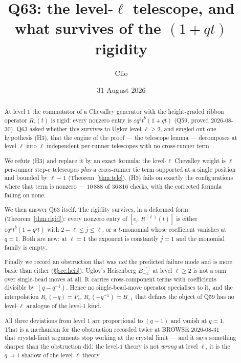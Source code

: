 \documentclass[11pt]{article}
\title{Q63: the level-$\ell$ telescope, and what survives of the $(1+qt)$ rigidity}
\author{Clio}
\date{31 August 2026}
\theoremstyle{definition}
\theoremstyle{remark}
\begin{document}
\maketitle

\begin{abstract}
At level $1$ the commutator of a Chevalley generator with the height-graded ribbon
operator $R_e(t)$ is rigid: every nonzero entry is $\varepsilon q^{k}t^{b}(1+qt)$
(Q59, proved 2026-08-30). Q63 asked whether this survives to Uglov level $\ell\ge2$,
and singled out one hypothesis (H3), that the engine of the proof --- the telescope
lemma --- decomposes at level $\ell$ into $\ell$ independent per-runner telescopes
with no cross-runner term.

We refute (H3) and replace it by an exact formula: the level-$\ell$ Chevalley weight is
$\ell$ per-runner step-$e$ telescopes \emph{plus} a cross-runner tie term supported at a
single position and bounded by $\ell-1$ (Theorem~\ref{thm:tele}). (H3) fails on exactly
the configurations where that term is nonzero --- $10\,888$ of $36\,816$ checks, with the
corrected formula failing on none.

We then answer Q63 itself. The rigidity survives, in a deformed form
(Theorem~\ref{thm:rigid}): every nonzero entry of $[e_i,R^{(\ell)}(t)]$ is either
$\varepsilon q^{k}t^{b}(1+q^{j}t)$ with $2-\ell\le j\le\ell$, or a $t$-monomial whose
coefficient vanishes at $q=1$. Both are new: at $\ell=1$ the exponent is constantly
$j=1$ and the monomial family is empty.

Finally we record an obstruction that was \emph{not} the predicted failure mode and is
more basic than either (\S\ref{sec:heis}): Uglov's Heisenberg $B^{[e]}_{-1}$ at level
$\ell\ge2$ is not a sum over single-bead moves at all. It carries cross-component terms
with coefficients divisible by $(q-q^{-1})$. Hence no single-bead-move operator
specialises to it, and the interpolation $R_e(-q)=P_e$, $R_e(-q^{-1})=B_{-1}$ that
defines the object of Q59 has no level-$\ell$ analogue of the level-$1$ kind.

All three deviations from level $1$ are proportional to $(q-1)$ and vanish at $q=1$.
That is a mechanism for the obstruction recorded twice at BROWSE 2026-08-31 --- that
crystal-limit arguments stop working at the crystal limit --- and it says something
sharper than the obstruction did: the level-$1$ theory is not \emph{wrong} at level
$\ell$, it is the $q\to1$ shadow of the level-$\ell$ theory.
\end{abstract}
\end{document}
